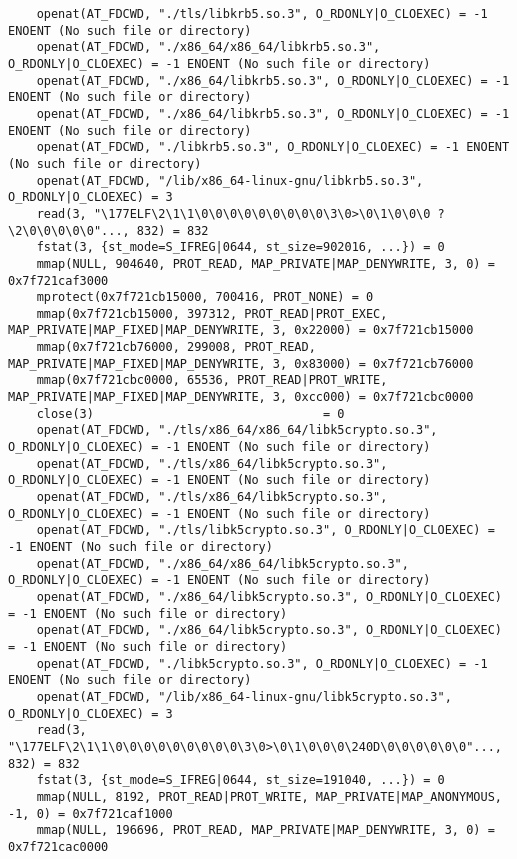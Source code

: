 \documentclass[pdf, unicode, 12pt, a4paper,oneside,fleqn]{article}
\begin{document}
{\begin{verbatim}
    openat(AT_FDCWD, "./tls/libkrb5.so.3", O_RDONLY|O_CLOEXEC) = -1 ENOENT (No such file or directory)
    openat(AT_FDCWD, "./x86_64/x86_64/libkrb5.so.3", O_RDONLY|O_CLOEXEC) = -1 ENOENT (No such file or directory)
    openat(AT_FDCWD, "./x86_64/libkrb5.so.3", O_RDONLY|O_CLOEXEC) = -1 ENOENT (No such file or directory)
    openat(AT_FDCWD, "./x86_64/libkrb5.so.3", O_RDONLY|O_CLOEXEC) = -1 ENOENT (No such file or directory)
    openat(AT_FDCWD, "./libkrb5.so.3", O_RDONLY|O_CLOEXEC) = -1 ENOENT (No such file or directory)
    openat(AT_FDCWD, "/lib/x86_64-linux-gnu/libkrb5.so.3", O_RDONLY|O_CLOEXEC) = 3
    read(3, "\177ELF\2\1\1\0\0\0\0\0\0\0\0\0\3\0>\0\1\0\0\0 ?\2\0\0\0\0\0"..., 832) = 832
    fstat(3, {st_mode=S_IFREG|0644, st_size=902016, ...}) = 0
    mmap(NULL, 904640, PROT_READ, MAP_PRIVATE|MAP_DENYWRITE, 3, 0) = 0x7f721caf3000
    mprotect(0x7f721cb15000, 700416, PROT_NONE) = 0
    mmap(0x7f721cb15000, 397312, PROT_READ|PROT_EXEC, MAP_PRIVATE|MAP_FIXED|MAP_DENYWRITE, 3, 0x22000) = 0x7f721cb15000
    mmap(0x7f721cb76000, 299008, PROT_READ, MAP_PRIVATE|MAP_FIXED|MAP_DENYWRITE, 3, 0x83000) = 0x7f721cb76000
    mmap(0x7f721cbc0000, 65536, PROT_READ|PROT_WRITE, MAP_PRIVATE|MAP_FIXED|MAP_DENYWRITE, 3, 0xcc000) = 0x7f721cbc0000
    close(3)                                = 0
    openat(AT_FDCWD, "./tls/x86_64/x86_64/libk5crypto.so.3", O_RDONLY|O_CLOEXEC) = -1 ENOENT (No such file or directory)
    openat(AT_FDCWD, "./tls/x86_64/libk5crypto.so.3", O_RDONLY|O_CLOEXEC) = -1 ENOENT (No such file or directory)
    openat(AT_FDCWD, "./tls/x86_64/libk5crypto.so.3", O_RDONLY|O_CLOEXEC) = -1 ENOENT (No such file or directory)
    openat(AT_FDCWD, "./tls/libk5crypto.so.3", O_RDONLY|O_CLOEXEC) = -1 ENOENT (No such file or directory)
    openat(AT_FDCWD, "./x86_64/x86_64/libk5crypto.so.3", O_RDONLY|O_CLOEXEC) = -1 ENOENT (No such file or directory)
    openat(AT_FDCWD, "./x86_64/libk5crypto.so.3", O_RDONLY|O_CLOEXEC) = -1 ENOENT (No such file or directory)
    openat(AT_FDCWD, "./x86_64/libk5crypto.so.3", O_RDONLY|O_CLOEXEC) = -1 ENOENT (No such file or directory)
    openat(AT_FDCWD, "./libk5crypto.so.3", O_RDONLY|O_CLOEXEC) = -1 ENOENT (No such file or directory)
    openat(AT_FDCWD, "/lib/x86_64-linux-gnu/libk5crypto.so.3", O_RDONLY|O_CLOEXEC) = 3
    read(3, "\177ELF\2\1\1\0\0\0\0\0\0\0\0\0\3\0>\0\1\0\0\0\240D\0\0\0\0\0\0"..., 832) = 832
    fstat(3, {st_mode=S_IFREG|0644, st_size=191040, ...}) = 0
    mmap(NULL, 8192, PROT_READ|PROT_WRITE, MAP_PRIVATE|MAP_ANONYMOUS, -1, 0) = 0x7f721caf1000
    mmap(NULL, 196696, PROT_READ, MAP_PRIVATE|MAP_DENYWRITE, 3, 0) = 0x7f721cac0000

\end{verbatim}}
\end{document}
